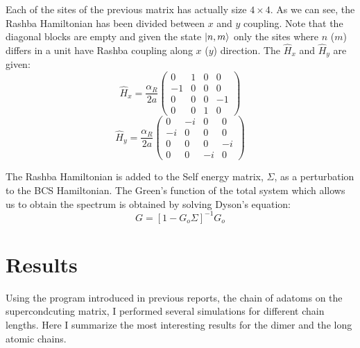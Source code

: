\documentclass[letterpaper,12pt]{article}
\begin{document}
Each of the sites of the previous matrix has actually size $4\times 4$. As we can see, the Rashba Hamiltonian has been divided between $x$ and $y$ coupling. Note that the diagonal blocks are empty and given the state $\ket{n,m}$ only the sites where $n$ ($m$) differs in a unit have Rashba coupling along $x$ ($y$) direction.
The $\hat{H}_x$ and $\hat{H}_y$ are given:
\vspace{0.5cm}
\begin{equation}
\hat{H}_x = 
    \frac{\alpha_R}{2a}\begin{pmatrix}
    0 & 1 & 0 & 0 \\
    -1 & 0 & 0 & 0 \\
    0 & 0 & 0 & -1 \\
    0 & 0 & 1 & 0
  \end{pmatrix}
\end{equation}
\vspace{0.5cm}
\begin{equation}
\hat{H}_y = 
    \frac{\alpha_R}{2a}\begin{pmatrix}
    0 & -i & 0 & 0 \\
    -i & 0 & 0 & 0 \\
    0 & 0 & 0 & -i \\
    0 & 0 & -i & 0
  \end{pmatrix}
\end{equation}

\vspace{0.5cm}
The Rashba Hamiltonian is added to the Self energy matrix, $\Sigma$, as a perturbation to the BCS Hamiltonian. The Green's function of the total system which allows us to obtain the spectrum is obtained by solving Dyson's equation:
\begin{equation}
    G = [1 - G_o\Sigma]^{-1}G_o
\end{equation}

\section{Results}
Using the program introduced in previous reports, the chain of adatoms on the supercondcuting matrix, I performed several simulations for different chain lengths. Here I summarize the most interesting results for the dimer and the long atomic chains.
\end{document}
